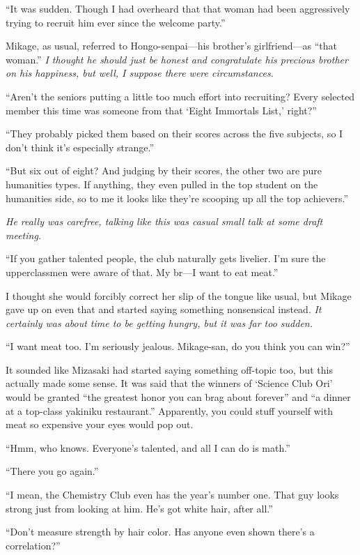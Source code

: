 \documentclass[
    a4paper,
    12pt,
    twoside,
    openany,
    UTF8,
    fontset=windows
]{ctexbook}
\begin{document}
``It was sudden. Though I had overheard that that woman had been aggressively trying to recruit him ever since the welcome party.''

Mikage, as usual, referred to Hongo-senpai---his brother's girlfriend---as ``that woman.'' \textit{I thought he should just be honest and congratulate his precious brother on his happiness, but well, I suppose there were circumstances.}

``Aren't the seniors putting a little too much effort into recruiting? Every selected member this time was someone from that `Eight Immortals List,' right?''

``They probably picked them based on their scores across the five subjects, so I don't think it's especially strange.''

``But six out of eight? And judging by their scores, the other two are pure humanities types. If anything, they even pulled in the top student on the humanities side, so to me it looks like they're scooping up all the top achievers.''

\textit{He really was carefree, talking like this was casual small talk at some draft meeting.}

``If you gather talented people, the club naturally gets livelier. I'm sure the upperclassmen were aware of that. My br---I want to eat meat.''

I thought she would forcibly correct her slip of the tongue like usual, but Mikage gave up on even that and started saying something nonsensical instead. \textit{It certainly was about time to be getting hungry, but it was far too sudden.}

``I want meat too. I'm seriously jealous. Mikage-san, do you think you can win?''

It sounded like Mizasaki had started saying something off-topic too, but this actually made some sense. It was said that the winners of `Science Club Ori' would be granted ``the greatest honor you can brag about forever'' and ``a dinner at a top-class yakiniku restaurant.'' Apparently, you could stuff yourself with meat so expensive your eyes would pop out.

``Hmm, who knows. Everyone's talented, and all I can do is math.''

``There you go again.''

``I mean, the Chemistry Club even has the year's number one. That guy looks strong just from looking at him. He's got white hair, after all.''

``Don't measure strength by hair color. Has anyone even shown there's a correlation?''
\end{document}
